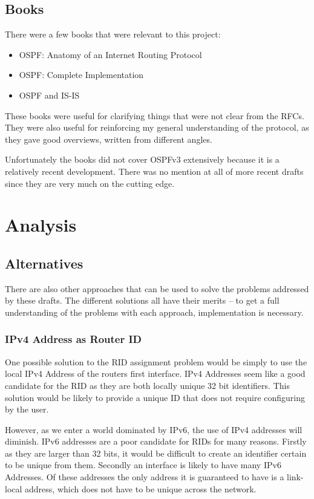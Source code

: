 \documentclass[12pt,a4paper,twoside]{report}
\begin{document}
\section{Books}
There were a few books that were relevant to this project:
\begin{itemize}
  \item OSPF: Anatomy of an Internet Routing Protocol \cite{OSPFAIRP}
  \item OSPF: Complete Implementation \cite{OSPFCI}
  \item OSPF and IS-IS \cite{OSPFvsISIS}
\end{itemize}

These books were useful for clarifying things that were not clear from the
RFCs. They were also useful for reinforcing my general understanding of the
protocol, as they gave good overviews, written from different angles. 

Unfortunately the books did not cover OSPFv3 extensively because it is a
relatively recent development. There was no mention at all of more recent
drafts since they are very much on the cutting edge.

\chapter{Analysis}
\section{Alternatives}
There are also other approaches that can be used to solve the problems
addressed by these drafts. The different solutions all have their merits -- to
get a full understanding of the problems with each approach, implementation is
necessary.

\subsection{IPv4 Address as Router ID}
One possible solution to the RID assignment problem would be simply to use the
local IPv4 Address of the routers first interface. IPv4 Addresses seem like a
good candidate for the RID as they are both locally unique 32 bit identifiers.
This solution would be likely to provide a unique ID that does not require
configuring by the user.
 
However, as we enter a world dominated by IPv6, the use of IPv4 addresses will
diminish. IPv6 addresses are a poor candidate for RIDs for many reasons.
Firstly as they are larger than 32 bits, it would be difficult to create an identifier
certain to be unique from them. Secondly an interface is likely to have
many IPv6 Addresses. Of these addresses the only address it is guaranteed to
have is a link-local address, which does not have to be unique across the
network. 
\end{document}
